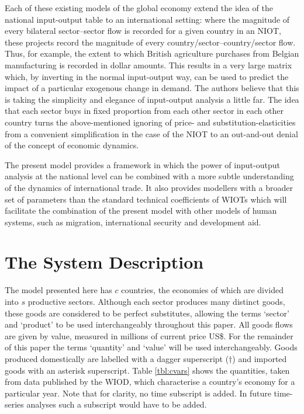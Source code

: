 \documentclass[a4paper]{article}
\begin{document}
Each of these existing models of the global economy extend the idea of the national input-output table to an international setting: where the magnitude of every bilateral sector--sector flow is recorded for a given country in an NIOT, these projects record the magnitude of every country/sector--country/sector flow.
Thus, for example, the extent to which British agriculture purchases from Belgian manufacturing is recorded in dollar amounts.
This results in a very large matrix which, by inverting in the normal input-output way, can be used to predict the impact of a particular exogenous change in demand.
The authors believe that this is taking the simplicity and elegance of input-output analysis a little far. The idea that each sector buys in fixed proportion from each other sector in each other country turns the above-mentioned ignoring of price- and substitution-elasticities from a convenient simplification in the case of the NIOT to an out-and-out denial of the concept of economic dynamics.

The present model provides a framework in which the power of input-output analysis at the national level can be combined with a more subtle understanding of the dynamics of international trade.
It also provides modellers with a broader set of parameters than the standard technical coefficients of WIOTs which will facilitate the combination of the present model with other models of human systems, such as migration, international security and development aid.

\section{The System Description} \label{sec:system}
The model presented here has $c$ countries, the economies of which are divided into $s$ productive sectors.
Although each sector produces many distinct goods, these goods are considered to be perfect substitutes, allowing the terms `sector' and `product' to be used interchangeably throughout this paper.
All goods flows are given by value, measured in millions of current price US\$.
For the remainder of this paper the terms `quantity' and `value' will be used interchangeably.
Goods produced domestically are labelled with a dagger superscript ($\dagger$) and imported goods with an asterisk superscript.
Table \ref{tbl:cvars} shows the quantities, taken from data published by the WIOD, which characterise a country's economy for a particular year.
Note that for clarity, no time subscript is added. In future time-series analyses such a subscript would have to be added.
\end{document}
